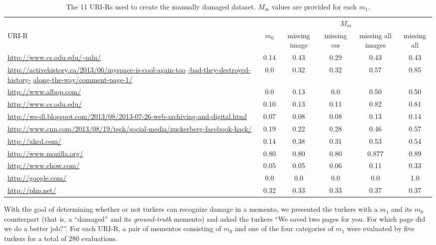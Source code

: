 \begin{table}[h!t]
\begin{tabular}{ p{6cm} | c |  c |  c |  c |  c }
	 & \multicolumn{5}{c}{$M_m$}\\
    URI-R & $m_0$ & missing image & missing css & missing all images & missing all\\
    	\hline
    	\hline
    \protect\url{http://www.cs.odu.edu/~mln/} & 0.14 & 0.43 & 0.29 & 0.43 & 0.43 \\
    	\hline 
    \url{http://activehistory.ca/2013/06/myspace-is-cool-again-too} \url{-bad-they-destroyed-history-} \url{along-the-way/comment-page-1/} & 0.0 & 0.32  & 0.32 & 0.57 & 0.85 \\
    	\hline
    \protect\url{http://www.albop.com/} & 0.0 & 0.13 & 0.0 & 0.50 & 0.50\\
    	\hline
    \protect\url{http://www.cs.odu.edu/} & 0.10 & 0.13 & 0.11 & 0.82 & 0.81 \\
    	\hline
    \protect\url{http://ws-dl.blogspot.com/2013/08/2013-07-26-web-archiving-and-digital.html} & 0.07 & 0.08 & 0.08 & 0.13 & 0.14 \\
    	\hline
    \protect\url{http://www.cnn.com/2013/08/19/tech/social-media/zuckerberg-facebook-hack/} & 0.19 & 0.22 & 0.28 & 0.46 & 0.57 \\
    	\hline
    \protect\url{http://xkcd.com/} & 0.14 & 0.38 & 0.31 & 0.53 & 0.54 \\
    	\hline
    \protect\url{http://www.mozilla.org/} & 0.80 & 0.80 & 0.80 & 0.877 & 0.89 \\
    	\hline
    \protect\url{http://www.ehow.com/} & 0.05 & 0.05 & 0.06 & 0.11 & 0.33 \\
    	\hline
    \protect\url{http://google.com/}  & 0.0 & 0.0 & 0.0 & 0.0 & 1.0  \\
    	\hline
    \protect\url{http://php.net/} & 0.32 & 0.33 & 0.33 & 0.37 & 0.37  \\
    	\hline
\end{tabular}
  \caption{The 11 URI-Rs used to create the manually damaged dataset. $M_m$ values are provided for each $m_1$.}
  \label{dataset}
\end{table}

With the goal of determining whether or not turkers can recognize damage in a memento, we presented the turkers with a $m_1$ and its $m_0$ counterpart (that is, a ``damaged'' and its \emph{ground-truth} memento) and asked the turkers ``We saved two pages for you. For which page did we do a better job?''. For each URI-R, a pair of mementos consisting of $m_0$ and one of the four categories of $m_1$ were evaluated by five turkers for a total of 280 evaluations. 

